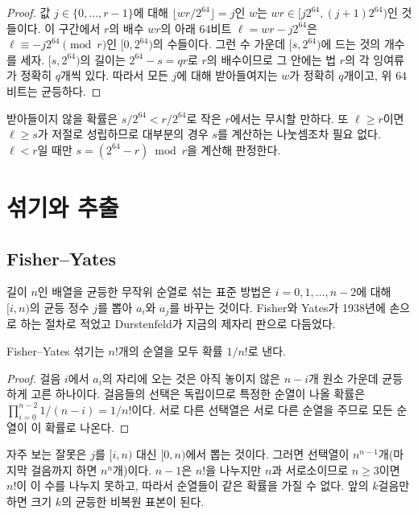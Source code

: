 \begin{proof}
값 $j\in\{0,\dots,r-1\}$에 대해 $\lfloor wr/2^{64}\rfloor=j$인 $w$는 $wr\in[j2^{64},(j+1)2^{64})$인 것들이다. 이 구간에서 $r$의 배수 $wr$의 아래 $64$비트 $\ell=wr-j2^{64}$은 $\ell\equiv-j2^{64}\pmod r$인 $[0,2^{64})$의 수들이다. 그런 수 가운데 $[s,2^{64})$에 드는 것의 개수를 세자. $[s,2^{64})$의 길이는 $2^{64}-s=qr$로 $r$의 배수이므로 그 안에는 법 $r$의 각 잉여류가 정확히 $q$개씩 있다. 따라서 모든 $j$에 대해 받아들여지는 $w$가 정확히 $q$개이고, 위 $64$비트는 균등하다.
\end{proof}

받아들이지 않을 확률은 $s/2^{64}<r/2^{64}$로 작은 $r$에서는 무시할 만하다. 또 $\ell\ge r$이면 $\ell\ge s$가 저절로 성립하므로 대부분의 경우 $s$를 계산하는 나눗셈조차 필요 없다. $\ell<r$일 때만 $s=(2^{64}-r)\bmod r$을 계산해 판정한다.

\section{섞기와 추출}
\label{sec:shuffle}

\subsection{Fisher--Yates}

길이 $n$인 배열을 균등한 무작위 순열로 섞는 표준 방법은 $i=0,1,\dots,n-2$에 대해 $[i,n)$의 균등 정수 $j$를 뽑아 $a_i$와 $a_j$를 바꾸는 것이다. Fisher와 Yates가 1938년에 손으로 하는 절차로 적었고\cite{fisher1938tables} Durstenfeld가 지금의 제자리 판으로 다듬었다\cite{durstenfeld1964}.

\begin{proposition}
Fisher--Yates 섞기는 $n!$개의 순열을 모두 확률 $1/n!$로 낸다.
\end{proposition}

\begin{proof}
걸음 $i$에서 $a_i$의 자리에 오는 것은 아직 놓이지 않은 $n-i$개 원소 가운데 균등하게 고른 하나이다. 걸음들의 선택은 독립이므로 특정한 순열이 나올 확률은 $\prod_{i=0}^{n-2}1/(n-i)=1/n!$이다. 서로 다른 선택열은 서로 다른 순열을 주므로 모든 순열이 이 확률로 나온다.
\end{proof}

자주 보는 잘못은 $j$를 $[i,n)$ 대신 $[0,n)$에서 뽑는 것이다. 그러면 선택열이 $n^{n-1}$개(마지막 걸음까지 하면 $n^n$개)이다. $n-1$은 $n!$을 나누지만 $n$과 서로소이므로 $n\ge3$이면 $n!$이 이 수를 나누지 못하고, 따라서 순열들이 같은 확률을 가질 수 없다. 앞의 $k$걸음만 하면 크기 $k$의 균등한 비복원 표본이 된다.

